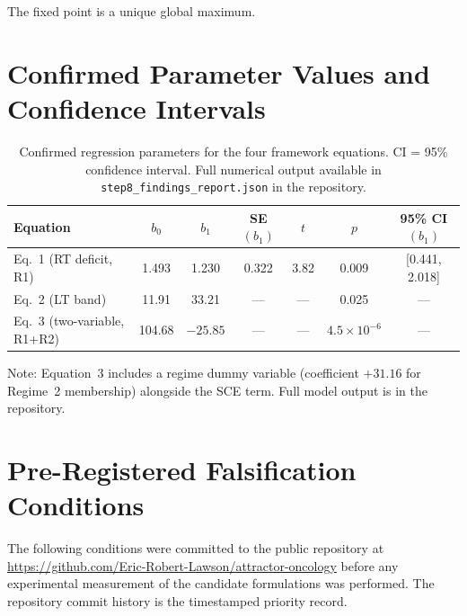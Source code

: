 \documentclass[11pt]{article}
\theoremstyle{plain}
\theoremstyle{definition}
\theoremstyle{remark}
\begin{document}
\noindent The fixed point is a unique global maximum.

\section{Confirmed Parameter Values and Confidence Intervals}
\label{app:params}

\begin{table}[h!]
\centering
\caption{Confirmed regression parameters for the four framework equations.
CI = 95\% confidence interval. Full numerical output available in
\texttt{step8\_findings\_report.json} in the repository.}
\label{tab:params}
\begin{tabular}{lcccccc}
\toprule
Equation & $b_0$ & $b_1$ & SE$(b_1)$ & $t$ & $p$ & 95\% CI$(b_1)$ \\
\midrule
Eq.~1 (RT deficit, R1) & 1.493 & 1.230 & 0.322 & 3.82 & 0.009 & [0.441, 2.018] \\
Eq.~2 (LT band) & 11.91 & 33.21 & --- & --- & 0.025 & --- \\
Eq.~3 (two-variable, R1+R2) & 104.68 & $-25.85$ & --- & --- & $4.5\!\times\!10^{-6}$ & --- \\
\bottomrule
\end{tabular}
\end{table}

\noindent Note: Equation~3 includes a regime dummy variable (coefficient $+31.16$
for Regime~2 membership) alongside the SCE term. Full model output is in the
repository.

\section{Pre-Registered Falsification Conditions}
\label{app:falsification}

The following conditions were committed to the public repository at
\url{https://github.com/Eric-Robert-Lawson/attractor-oncology}
before any experimental measurement of the candidate formulations was performed.
The repository commit history is the timestamped priority record.
\end{document}
